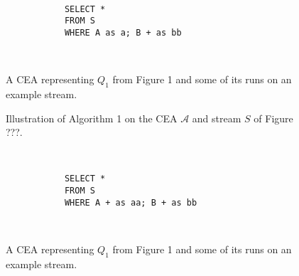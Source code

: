 \begin{figure}[H]
  \centering
  \begin{subfigure}[t]{\textwidth}
    \centering
  \end{subfigure}
  \\
  \begin{subfigure}[b]{\textwidth}
    \begin{verbatim}
      SELECT *
      FROM S
      WHERE A as a; B + as bb
    \end{verbatim}
  \end{subfigure}
  \\
  \begin{subfigure}[b]{\textwidth}
    \centering
  \end{subfigure}
  \caption{A CEA representing $Q_{1}$ from Figure 1 and some of its runs on an example stream.}
  \label{fig:label}
\end{figure}

\begin{figure}[H]
  \centering
  \begin{subfigure}[t]{0.1\linewidth}
  \end{subfigure}
  \begin{subfigure}[t]{0.1\linewidth}
  \end{subfigure}
  \begin{subfigure}[t]{0.24\linewidth}
  \end{subfigure}
  \begin{subfigure}[t]{0.24\linewidth}
  \end{subfigure}
  \begin{subfigure}[t]{0.28\linewidth}
  \end{subfigure}
  \caption{Illustration of Algorithm 1 on the CEA $\mathcal{A}$ and stream $S$ of Figure ???.}
  \label{fig:label}
\end{figure}

\begin{figure}[H]
  \centering
  \begin{subfigure}[t]{\textwidth}
    \centering
  \end{subfigure}
  \\
  \begin{subfigure}[b]{\textwidth}
    \begin{verbatim}
      SELECT *
      FROM S
      WHERE A + as aa; B + as bb
    \end{verbatim}
  \end{subfigure}
  \\
  \begin{subfigure}[b]{\textwidth}
    \centering
  \end{subfigure}
  \caption{A CEA representing $Q_{1}$ from Figure 1 and some of its runs on an example stream.}
  \label{fig:label}
\end{figure}

